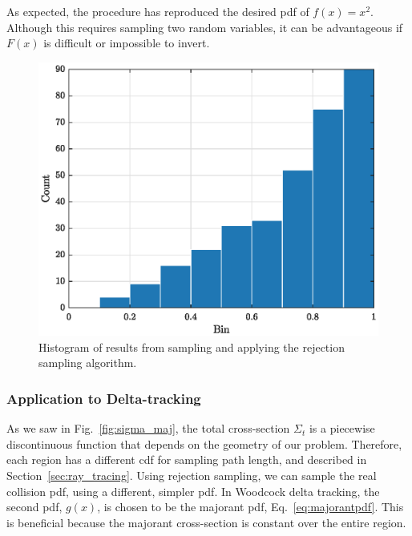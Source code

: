 As expected, the procedure has reproduced the desired \gls{pdf} of
$f(x) = x^2$. Although this requires sampling two random variables, it
can be advantageous if $F(x)$ is difficult or impossible to invert.
\begin{figure}[hbtp]
  \centering
  \includegraphics[scale=0.75]{images/pdf_histogram}
  \caption{Histogram of results from sampling and applying the
    rejection sampling algorithm.}
  \label{fig:pdf_histogram}
\end{figure}
\subsubsection{Application to Delta-tracking}
\label{sec:application_to_delta-tracking}

As we saw in Fig.~\ref{fig:sigma_maj}, the total cross-section
$\Sigma_t$ is a piecewise discontinuous function that depends on the
geometry of our problem. Therefore, each region has a different
\gls{cdf} for sampling path length, and described in
Section~\ref{sec:ray_tracing}. Using rejection sampling, we can sample
the real collision \gls{pdf}, using a different, simpler \gls{pdf}.
In Woodcock delta tracking, the second \gls{pdf}, $g(x)$, is chosen to
be the majorant \gls{pdf}, Eq.~\eqref{eq:majorantpdf}. This is
beneficial because the majorant cross-section is constant over the
entire region.

